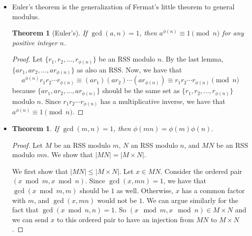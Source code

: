 \documentclass{article}
\newtheorem{theorem}[lemma]{Theorem}
\begin{document}
\begin{itemize}
\begin{proof}
        Let $ar_i, ar_j$ be two different members of $aR$. 
        We have that $ar_i \equiv a r_j \pmod{n} \iff r_i \equiv r_j \pmod{n}$
        because we can multiply $a^{_1}$ to both sides of the equation.
        It follows that none of the $a r_i$'s are congruent modulo $n$.
        So $aR$ is a reduced residue system.
        
        ($\leftarrow$) Note that $r_i \equiv a^{-1} a r_i \pmod{n}$. So we
        can prove this side of the lemma by the same argument above.
      \end{proof}
    
    \item Euler's theorem is the generalization of Fermat's little theorem to
      general modulus.
      
      \begin{theorem}[Euler's]
        If $\gcd(a,n) = 1$, then $a^{\phi(n)} \equiv 1 \pmod{n}$ for any positive integer $n$.
      \end{theorem}
      
      \begin{proof}
        Let $\{ r_1, r_2, \dotsc, r_{\phi(n)} \}$ be an RSS modulo $n$.
        By the last lemma, $\{ a r_1, a r_2, \dotsc, a r_{\phi(n)} \}$
        as also an RSS. Now, we have that
        $$
        a^{\phi(n)} r_1 r_2 \dotsm r_{\phi(n)} \equiv 
        (a r_1) (a r_2) \dotsm (a r_{\phi(n)}) \equiv 
        r_1 r_2 \dotsm r_{\phi(n)} \pmod{n}$$
        because $\{ a r_1, a r_2, \dotsc, a r_{\phi(n)} \}$ should
        be the same set as $\{ r_1, r_2, \dotsc, r_{\phi(n)} \}$
        modulo $n$. Since $r_1 r_2 \dotsm r_{\phi(n)}$ has a multiplicative
        inverse, we have that $a^{\phi(n)} \equiv 1 \pmod{n}.$
      \end{proof}
      
    \item
      \begin{theorem}
        If $\gcd(m,n) = 1$, then $\phi(mn) = \phi(m) \phi(n).$
      \end{theorem}
      
      \begin{proof}
        Let $M$ be an RSS modulo $m$, $N$ an RSS modulo $n$,
        and $MN$ be an RSS modulo $mn$. We show that
        $|MN| = |M \times N|.$
        
        We first show that $|MN| \leq |M \times N|$. Let $x \in MN$. 
        Consider the ordered pair $(x \bmod m, x \bmod n)$. Since $\gcd(x, mn) = 1$,
        we have that $\gcd(x \bmod m, m)$ should be $1$ as well. Otherwise,
        $x$ has a common factor with $m$, and $\gcd(x,mn)$ would not be $1.$ 
        We can argue similarly for the fact that $\gcd(x \bmod n, n) = 1$.
        So $(x \mod m, x \mod n) \in M \times N$ and we can send $x$ to this
        ordered pair to have an injection from $MN$ to $M \times N$.
        

\end{proof}
\end{itemize}
\end{document}
